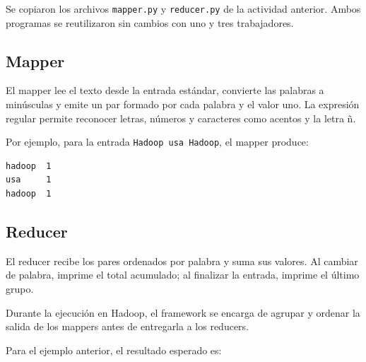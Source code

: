 Se copiaron los archivos \texttt{mapper.py} y 
\texttt{reducer.py} de la actividad anterior. Ambos programas se reutilizaron sin cambios con uno y tres trabajadores.

\noindent
\begin{minipage}{\textwidth}

\subsection{Mapper}

El mapper lee el texto desde la entrada estándar,
convierte las palabras a minúsculas y emite un par
formado por cada palabra y el valor uno.
La expresión regular permite reconocer letras,
números y caracteres como acentos y la letra ñ.



\end{minipage}
\par

Por ejemplo, para la entrada \texttt{Hadoop usa Hadoop}, 
el mapper produce:

\begin{lstlisting}[language={}]
hadoop  1
usa     1
hadoop  1
\end{lstlisting}

\noindent
\begin{minipage}{\textwidth}

\subsection{Reducer}

El reducer recibe los pares ordenados por palabra
y suma sus valores. Al cambiar de palabra, imprime
el total acumulado; al finalizar la entrada, imprime
el último grupo.

Durante la ejecución en Hadoop, el framework se
encarga de agrupar y ordenar la salida de los
mappers antes de entregarla a los reducers.



\end{minipage}
\par

Para el ejemplo anterior, el resultado esperado es:


